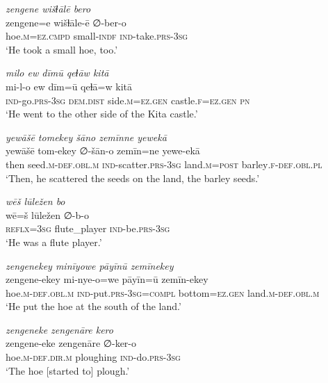 \ea \label{ŽP.30}
\textit{zengene wišɫālē bero} \\ 
\gll zengene=e wišɫāle-ē ∅-ber-o \\ 
 hoe\textsc{.m}\textsc{=ez}\textsc{.cmpd} small\textsc{-indf} \textsc{ind-}take\textsc{.prs}\textsc{-3sg} \\ 
\glt `He took a small hoe, too.'
\z 
 
\ea \label{ŽP.31}
\textit{milo ew dīmū qeɫāw kitā} \\ 
\gll mi-l-o ew dīm=ū qeɫā=w kitā \\ 
 \textsc{ind-}go\textsc{.prs}\textsc{-3sg} \textsc{dem.dist} side\textsc{.m}\textsc{\textsc{=ez.gen}} castle\textsc{.f}\textsc{\textsc{=ez.gen}} \textsc{pn} \\ 
\glt `He went to the other side of the Kita castle.'
\z 
 
\ea \label{ŽP.32}
\textit{yewāšē tomekey šāno zemīnne yewekā} \\ 
\gll yewāšē tom-ekey ∅-šān-o zemīn=ne yewe-ekā \\ 
 then seed\textsc{.m}\textsc{-def}\textsc{.obl}\textsc{.m} \textsc{ind-}scatter\textsc{.prs}\textsc{-3sg} land\textsc{.m}\textsc{=\textsc{post}} barley\textsc{.f}\textsc{-def}\textsc{.obl}\textsc{.pl} \\ 
\glt `Then, he scattered the seeds on the land, the barley seeds.'
\z 
 
\ea \label{ŽP.33}
\textit{wēš lūležen bo} \\ 
\gll wē=š lūležen ∅-b-o \\ 
 \textsc{reflx}\textsc{=3sg} flute\_player \textsc{ind-}be\textsc{.prs}\textsc{-3sg} \\ 
\glt `He was a flute player.'
\z 
 
\ea \label{ŽP.34}
\textit{zengenekey minīyowe pāyīnū zemīnekey} \\ 
\gll zengene-ekey mi-nye-o=we pāyīn=ū zemīn-ekey \\ 
 hoe\textsc{.m}\textsc{-def}\textsc{.obl}\textsc{.m} \textsc{ind-}put\textsc{.prs}\textsc{-3sg}\textsc{=compl} bottom\textsc{\textsc{=ez.gen}} land\textsc{.m}\textsc{-def}\textsc{.obl}\textsc{.m} \\ 
\glt `He put the hoe at the south of the land.'
\z 
 
\ea \label{ŽP.35}
\textit{zengeneke zengenāre kero} \\ 
\gll zengene-eke zengenāre ∅-ker-o \\ 
 hoe\textsc{.m}\textsc{-def}\textsc{.dir}\textsc{.m} ploughing \textsc{ind-}do\textsc{.prs}\textsc{-3sg} \\ 
\glt `The hoe [started to] plough.'
\z 
 
